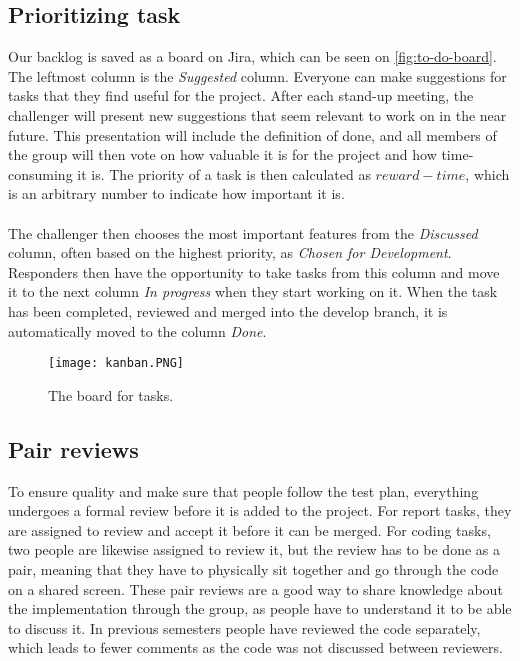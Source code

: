 \subsection{Prioritizing task}
Our backlog is saved as a board on Jira, which can be seen on \autoref{fig:to-do-board}.
The leftmost column is the \textit{Suggested} column.
Everyone can make suggestions for tasks that they find useful for the project.
After each stand-up meeting, the challenger will present new suggestions that seem relevant to work on in the near future.
This presentation will include the definition of done, and all members of the group will then vote on how valuable it is for the project and how time-consuming it is.
The priority of a task is then calculated as $reward - time$, which is an arbitrary number to indicate how important it is.
\\\\
The challenger then chooses the most important features from the \textit{Discussed} column, often based on the highest priority, as \textit{Chosen for Development}.
Responders then have the opportunity to take tasks from this column and move it to the next column \textit{In progress} when they start working on it.
When the task has been completed, reviewed and merged into the develop branch, it is automatically moved to the column \textit{Done}.
\begin{figure}[H]
    \centering
    \texttt{[image: kanban.PNG]}
    \caption{The board for tasks.}
    \label{fig:to-do-board}
\end{figure}

\subsection{Pair reviews}
To ensure quality and make sure that people follow the test plan, everything undergoes a formal review before it is added to the project.
For report tasks, they are assigned to review and accept it before it can be merged.
For coding tasks, two people are likewise assigned to review it, but the review has to be done as a pair, meaning that they have to physically sit together and go through the code on a shared screen.
These pair reviews are a good way to share knowledge about the implementation through the group, as people have to understand it to be able to discuss it.
In previous semesters people have reviewed the code separately, which leads to fewer comments as the code was not discussed between reviewers.
